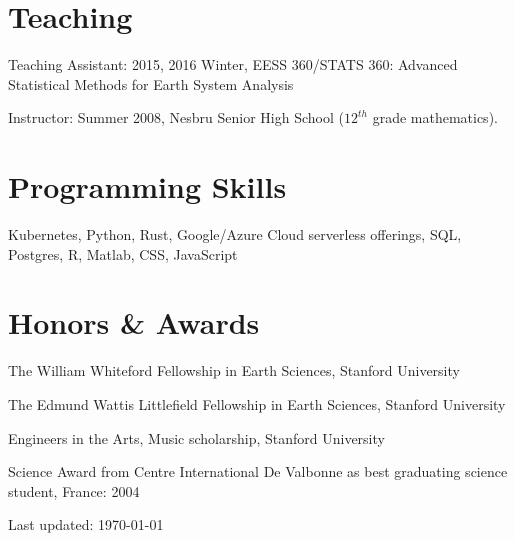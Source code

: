 \documentclass[letterpaper, 12pt]{article}
\renewenvironment{itemize}{
  \begin{list}{}{
    \setlength{\leftmargin}{1.5em}
  }
}{
  \end{list}
}
\begin{document}
\section*{Teaching}
  \begin{itemize}
    \item{Teaching Assistant: 2015, 2016 Winter, EESS 360/STATS 360: Advanced Statistical Methods for Earth System Analysis}
  \item   Instructor: Summer 2008, Nesbru Senior High School ($12^{th}$ grade mathematics).
  \end{itemize}

 \section*{Programming Skills}
  \begin{itemize}
    \item{Kubernetes, Python, Rust, Google/Azure Cloud serverless offerings, SQL, Postgres, R, Matlab, CSS, JavaScript}
  \end{itemize}
  
  
\section*{Honors \& Awards}
\begin{itemize}
  \item{The William Whiteford Fellowship in Earth Sciences, Stanford University }
  \item{The Edmund Wattis Littlefield Fellowship in Earth Sciences, Stanford University}
  \item{Engineers in the Arts, Music scholarship, Stanford University}
  \item{Science Award from Centre International De Valbonne as best graduating science student, France: 2004}
\end{itemize}
 
\bigskip

\begin{center}
  \begin{footnotesize}
    Last updated: \today \\
  \end{footnotesize}
\end{center}
\end{document}
